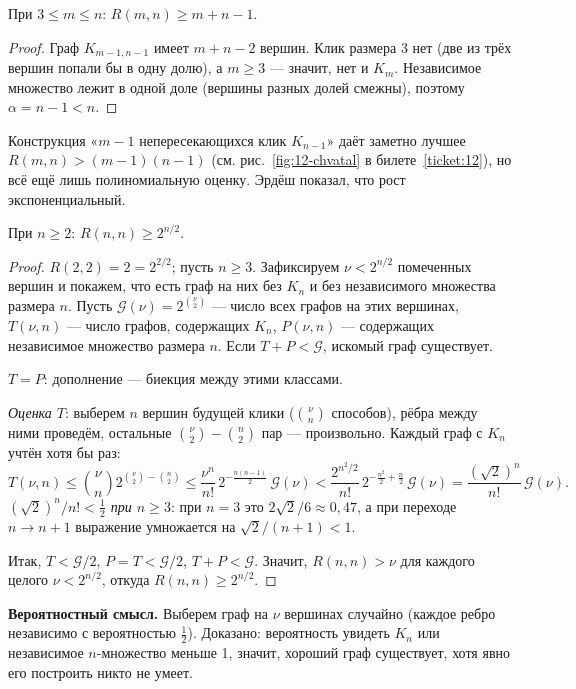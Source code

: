 \begin{lemma}
При \(3\le m\le n\): \(R(m,n)\ge m+n-1\).
\end{lemma}
\begin{proof}
Граф \(K_{m-1,n-1}\) имеет \(m+n-2\) вершин. Клик размера 3 нет (две из трёх вершин
попали бы в одну долю), а \(m\ge3\) — значит, нет и \(K_m\). Независимое множество лежит
в одной доле (вершины разных долей смежны), поэтому \(\alpha=n-1<n\).
\end{proof}
Конструкция «\(m-1\) непересекающихся клик \(K_{n-1}\)» даёт заметно лучшее
\(R(m,n)>(m-1)(n-1)\) (см. рис.~\ref{fig:12-chvatal} в билете~\ref{ticket:12}), но всё
ещё лишь полиномиальную оценку. Эрдёш показал, что рост экспоненциальный.


\begin{theorem}[Эрдёш, 1947]
При \(n\ge2\): \(R(n,n)\ge2^{n/2}\).
\end{theorem}
\begin{proof}
\(R(2,2)=2=2^{2/2}\); пусть \(n\ge3\). Зафиксируем \(\nu<2^{n/2}\) помеченных вершин и
покажем, что есть граф на них без \(K_n\) и без независимого множества размера \(n\).
Пусть \(\mathcal G(\nu)=2^{\binom\nu2}\) — число всех графов на этих вершинах,
\(T(\nu,n)\) — число графов, содержащих \(K_n\), \(P(\nu,n)\) — содержащих независимое
множество размера \(n\). Если \(T+P<\mathcal G\), искомый граф существует.

\emph{\(T=P\)}: дополнение — биекция между этими классами.

\emph{Оценка \(T\)}: выберем \(n\) вершин будущей клики (\(\binom{\nu}{n}\) способов), рёбра
между ними проведём, остальные \(\binom\nu2-\binom n2\) пар — произвольно. Каждый граф с
\(K_n\) учтён хотя бы раз:
\[
T(\nu,n)\le\binom{\nu}{n}2^{\binom\nu2-\binom n2}
\le\frac{\nu^n}{n!}\,2^{-\frac{n(n-1)}2}\,\mathcal G(\nu)
<\frac{2^{n^2/2}}{n!}\,2^{-\frac{n^2}2+\frac n2}\,\mathcal G(\nu)
=\frac{(\sqrt2)^n}{n!}\,\mathcal G(\nu).
\]
\emph{\((\sqrt2)^n/n!<\tfrac12\) при \(n\ge3\)}: при \(n=3\) это \(2\sqrt2/6\approx0{,}47\), а при
переходе \(n\to n+1\) выражение умножается на \(\sqrt2/(n+1)<1\).

Итак, \(T<\mathcal G/2\), \(P=T<\mathcal G/2\), \(T+P<\mathcal G\). Значит, \(R(n,n)>\nu\) для каждого
целого \(\nu<2^{n/2}\), откуда \(R(n,n)\ge2^{n/2}\).
\end{proof}
\begin{tcolorbox}[colback=cbGrayBack,colframe=cbGray!55]
\textbf{Вероятностный смысл.} Выберем граф на \(\nu\) вершинах случайно (каждое ребро
независимо с вероятностью \(\tfrac12\)). Доказано: вероятность увидеть \(K_n\) или
независимое \(n\)-множество меньше 1, значит, хороший граф существует, хотя
явно его построить никто не умеет.
\end{tcolorbox}


